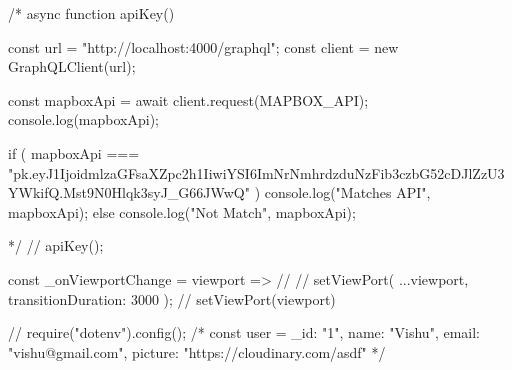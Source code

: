 /* async function apiKey() {
    const url = "http://localhost:4000/graphql";
    const client = new GraphQLClient(url);

    const mapboxApi = await client.request(MAPBOX_API);
    console.log(mapboxApi);

    if (
      mapboxApi ===
      "pk.eyJ1IjoidmlzaGFsaXZpc2h1IiwiYSI6ImNrNmhrdzduNzFib3czbG52cDJlZzU3YWkifQ.Mst9N0Hlqk3syJ_G66JWwQ"
    ) {
      console.log("Matches API", mapboxApi);
    } else {
      console.log("Not Match", mapboxApi);
    }
  } */
  // apiKey();


  const _onViewportChange = viewport =>
  //   // setViewPort({ ...viewport, transitionDuration: 3000 });
  //   setViewPort(viewport)


  // require("dotenv").config();
/* const user = {
    _id: "1",
    name: "Vishu",
    email: "vishu@gmail.com",
    picture: "https://cloudinary.com/asdf"
}  */